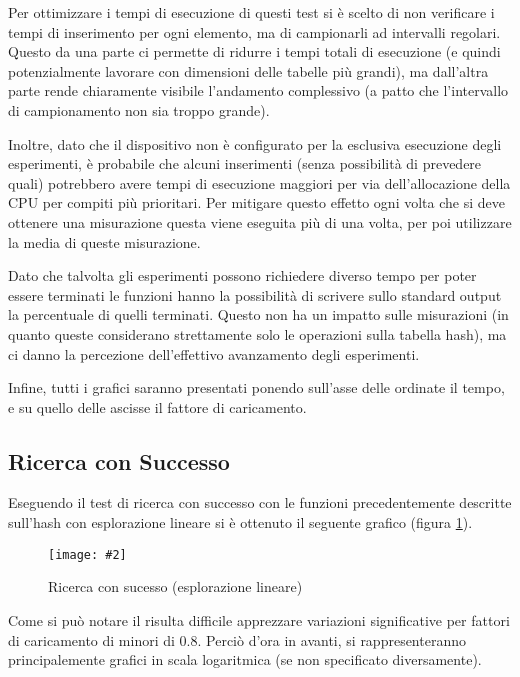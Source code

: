 \documentclass{article}
\newcommand{\image}[3][1]{
	\centering
	\texttt{[image: \#2]}
	\caption{#3}
}
\begin{document}
Per ottimizzare i tempi di esecuzione di questi test si è scelto di non verificare i tempi di inserimento per ogni elemento, ma di campionarli ad intervalli regolari. Questo da una parte ci permette di ridurre i tempi totali di esecuzione (e quindi potenzialmente lavorare con dimensioni delle tabelle più grandi), ma dall'altra parte rende chiaramente visibile l'andamento complessivo (a patto che l'intervallo di campionamento non sia troppo grande).

Inoltre, dato che il dispositivo non è configurato per la esclusiva esecuzione degli esperimenti, è probabile che alcuni inserimenti (senza possibilità di prevedere quali) potrebbero avere tempi di esecuzione maggiori per via dell'allocazione della CPU per compiti più prioritari. Per mitigare questo effetto ogni volta che si deve ottenere una misurazione questa viene eseguita più di una volta, per poi utilizzare la media di queste misurazione.

Dato che talvolta gli esperimenti possono richiedere diverso tempo per poter essere terminati le funzioni hanno la possibilità di scrivere sullo standard output la percentuale di quelli terminati. Questo non ha un impatto sulle misurazioni (in quanto queste considerano strettamente solo le operazioni sulla tabella hash), ma ci danno la percezione dell'effettivo avanzamento degli esperimenti.

Infine, tutti i grafici saranno presentati ponendo sull'asse delle ordinate il tempo, e su quello delle ascisse il fattore di caricamento.

\subsection{Ricerca con Successo}

Eseguendo il test di ricerca con successo con le funzioni precedentemente descritte sull'hash con esplorazione lineare si è ottenuto il seguente grafico (figura \ref{fig:Successo_Lineare_scala_lineare}).
\begin{figure}[H]
\image[0.75]{Successo_Lineare_scala_lineare}{Ricerca con sucesso (esplorazione lineare)}
\label{fig:Successo_Lineare_scala_lineare}
\end{figure}

\label{Motivazione_scala}
Come si può notare il risulta difficile apprezzare variazioni significative per fattori di caricamento di minori di 0.8. Perciò d'ora in avanti, si rappresenteranno principalemente grafici in scala logaritmica (se non specificato diversamente). 
\end{document}
